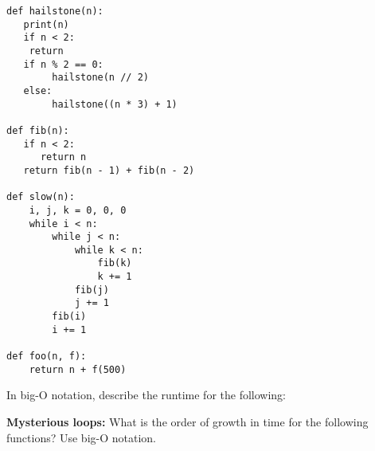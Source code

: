 \documentclass{exam}
\begin{document}
\begin{questions}
\begin{blocksection}
\question
\begin{lstlisting}
def hailstone(n):
   print(n)
   if n < 2:
    return
   if n % 2 == 0:
        hailstone(n // 2)
   else:
        hailstone((n * 3) + 1)

def fib(n):
   if n < 2:
      return n
   return fib(n - 1) + fib(n - 2)

def slow(n):
    i, j, k = 0, 0, 0
    while i < n:
        while j < n:
            while k < n:
                fib(k)
                k += 1
            fib(j)
            j += 1
        fib(i)
        i += 1

def foo(n, f):
    return n + f(500)
\end{lstlisting}
In big-O notation, describe the runtime for the following:

\end{blocksection}

\begin{blocksection}
\question \textbf{Mysterious loops:} What is the order of growth in time for the
following functions? Use big-O notation.

\end{blocksection}
\end{questions}
\end{document}

